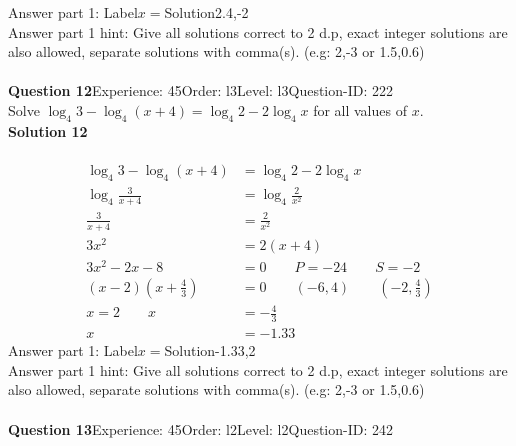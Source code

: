 \documentclass{article}
\begin{document}
Answer part 1: \hspace{10pt}Label\hspace{10pt}$x=$\hspace{10pt}Solution\hspace{10pt}2.4,-2\\
Answer part 1 hint: \hspace{15pt} Give all solutions correct to 2 d.p, exact integer solutions are also allowed, separate solutions with comma(s). (e.g: 2,-3 or 1.5,0.6)\\
\\[4pt]
\noindent\textbf{Question 12}\hspace{20pt}Experience: 45\hspace{20pt}Order: l3\hspace{20pt}Level: l3\hspace{20pt}Question-ID: 222\\[2pt]
Solve $\log_{4}3-\log_{4}(x+4)=\log_{4}2-2\log_{4}x$ for all values of $x$.\\[4pt]
\noindent\textbf{Solution 12}\\[2pt]
\\[-35pt]\begin{align*}
\log_{4}3-\log_{4}(x+4)&=\log_{4}2-2\log_{4}x\\[2pt]
\log_{4}\displaystyle\frac{3}{x+4}&=\log_{4}\displaystyle\frac{2}{x^2}\\[2pt]
\displaystyle\frac{3}{x+4}&=\displaystyle\frac{2}{x^2}\\[2pt]
3x^2&=2(x+4)\\[2pt]
3x^2-2x-8&=0\qquad P=-24\qquad S=-2\\[2pt]
(x-2)\left(x+\displaystyle\frac{4}{3}\right)&=0\qquad (-6,4)\qquad \left(-2,\displaystyle\frac{4}{3}\right)\\[2pt]
x=2\qquad x&=-\displaystyle\frac{4}{3}\\[2pt]
x&=-1.33
\end{align*}
Answer part 1: \hspace{10pt}Label\hspace{10pt}$x=$\hspace{10pt}Solution\hspace{10pt}-1.33,2\\
Answer part 1 hint: \hspace{15pt} Give all solutions correct to 2 d.p, exact integer solutions are also allowed, separate solutions with comma(s). (e.g: 2,-3 or 1.5,0.6)\\
\\[4pt]
\noindent\textbf{Question 13}\hspace{20pt}Experience: 45\hspace{20pt}Order: l2\hspace{20pt}Level: l2\hspace{20pt}Question-ID: 242\\[2pt]
\end{document}
